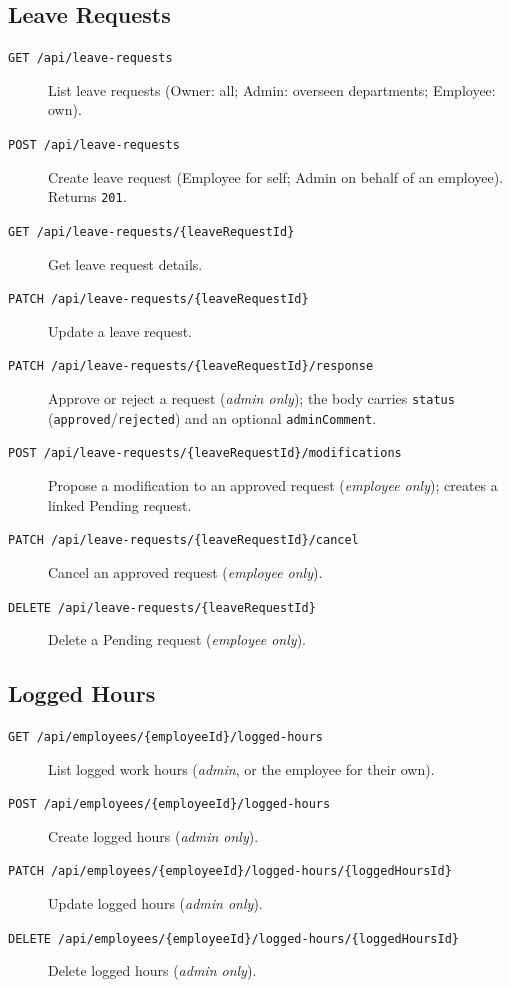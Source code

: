 \documentclass[11pt,a4paper]{article}
\begin{document}
\subsection{Leave Requests}
\begin{description}
    \item[\texttt{GET /api/leave-requests}] List leave requests (Owner: all; Admin: overseen departments; Employee: own).
    \item[\texttt{POST /api/leave-requests}] Create leave request (Employee for self; Admin on behalf of an employee). Returns \texttt{201}.
    \item[\texttt{GET /api/leave-requests/\{leaveRequestId\}}] Get leave request details.
    \item[\texttt{PATCH /api/leave-requests/\{leaveRequestId\}}] Update a leave request.
    \item[\texttt{PATCH /api/leave-requests/\{leaveRequestId\}/response}] Approve or reject a request (\textit{admin only}); the body carries \texttt{status} (\texttt{approved}/\texttt{rejected}) and an optional \texttt{adminComment}.
    \item[\texttt{POST /api/leave-requests/\{leaveRequestId\}/modifications}] Propose a modification to an approved request (\textit{employee only}); creates a linked Pending request.
    \item[\texttt{PATCH /api/leave-requests/\{leaveRequestId\}/cancel}] Cancel an approved request (\textit{employee only}).
    \item[\texttt{DELETE /api/leave-requests/\{leaveRequestId\}}] Delete a Pending request (\textit{employee only}).
\end{description}

\subsection{Logged Hours}
\begin{description}
    \item[\texttt{GET /api/employees/\{employeeId\}/logged-hours}] List logged work hours (\textit{admin}, or the employee for their own).
    \item[\texttt{POST /api/employees/\{employeeId\}/logged-hours}] Create logged hours (\textit{admin only}).
    \item[\texttt{PATCH /api/employees/\{employeeId\}/logged-hours/\{loggedHoursId\}}] Update logged hours (\textit{admin only}).
    \item[\texttt{DELETE /api/employees/\{employeeId\}/logged-hours/\{loggedHoursId\}}] Delete logged hours (\textit{admin only}).
\end{description}
\end{document}
